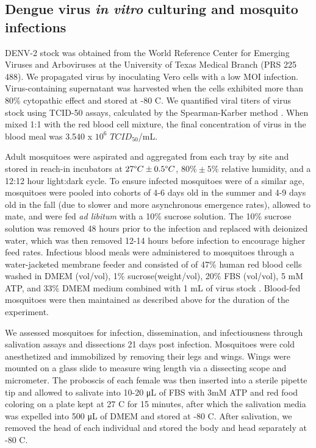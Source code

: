 \documentclass[12pt]{article}
\begin{document}
\subsection{Dengue virus \textit{in vitro} culturing and mosquito infections}
DENV-2 stock was obtained from the World Reference Center for Emerging Viruses and Arboviruses at the University of Texas Medical Branch (PRS 225 488). We propagated virus by inoculating Vero cells with a low MOI infection. Virus-containing supernatant was harvested when the cells exhibited more than 80\% cytopathic effect and stored at -80 \degree C. We quantified viral titers of virus stock using TCID-50 assays, calculated by the Spearman-Karber method \citep{shao2016}. When mixed 1:1 with the red blood cell mixture, the final concentration of virus in the blood meal was 3.540 x $10^6$ $TCID_{50}$/mL.

Adult mosquitoes were aspirated and aggregated from each tray by site and stored in reach-in incubators at $27 \degree C \pm 0.5 \degree C$, $80\% \pm 5\%$ relative humidity, and a 12:12 hour light:dark cycle. To ensure infected mosquitoes were of a similar age, mosquitoes were pooled into cohorts of 4-6 days old in the summer and 4-9 days old in the fall (due to slower and more asynchronous emergence rates), allowed to mate, and were fed \textit{ad libitum} with a 10\% sucrose solution. The 10\% sucrose solution was removed 48 hours prior to the infection and replaced with deionized water, which was then removed 12-14 hours before infection to encourage higher feed rates. Infectious blood meals were administered to mosquitoes through a water-jacketed membrane feeder and consisted of of 47\% human red blood cells washed in DMEM (vol/vol), 1\% sucrose(weight/vol), 20\% FBS (vol/vol), 5 mM ATP, and 33\% DMEM medium combined with 1 mL of virus stock \citep{shan2016}. Blood-fed mosquitoes were then maintained as described above for the duration of the experiment.


We assessed mosquitoes for infection, dissemination, and infectiousness through salivation assays and dissections \citep{anderson2010} 21 days post infection. Mosquitoes were cold anesthetized and immobilized by removing their legs and wings. Wings were mounted on a glass slide to measure wing length via a dissecting scope and micrometer. The proboscis of each female was then inserted into a sterile pipette tip and allowed to salivate into 10-20 \si{\micro\liter} of FBS with 3mM ATP and red food coloring on a plate kept at 27 \degree C for 15 minutes, after which the salivation media was expelled into 500 \si{\micro\liter} of DMEM and stored at -80 \degree C. After salivation, we removed the head of each individual and stored the body and head separately at -80 \degree C.
\end{document}
